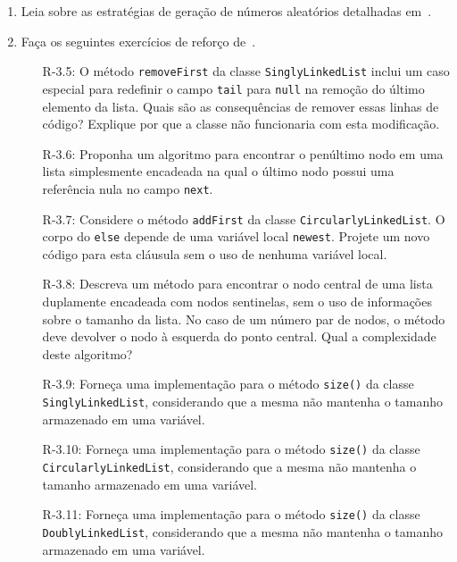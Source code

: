 \begin{enumerate}
	\item Leia sobre as estratégias de geração de números aleatórios detalhadas em~\cite{GoodrichAndTamassia2013}.
	
	\item Faça os seguintes exercícios de reforço de~\cite{GoodrichEtAl2014}.
	\begin{itemize}
		\item[R-3.5:] O método \texttt{removeFirst} da classe \texttt{SinglyLinkedList} inclui um caso especial para redefinir o campo \texttt{tail} para \texttt{null} na remoção do último elemento da lista. Quais são as consequências de remover essas linhas de código? Explique por que a classe não funcionaria com esta modificação.
		
		\item[R-3.6:] Proponha um algoritmo para encontrar o penúltimo nodo em uma lista simplesmente encadeada na qual o último nodo possui uma referência nula no campo \texttt{next}.
		
		\item[R-3.7:] Considere o método \texttt{addFirst} da classe \texttt{CircularlyLinkedList}. O corpo do \texttt{else} depende de uma variável local \texttt{newest}. Projete um novo código para esta cláusula sem o uso de nenhuma variável local.
		
		\item[R-3.8:] Descreva um método para encontrar o nodo central de uma lista duplamente encadeada com nodos sentinelas, sem o uso de informações sobre o tamanho da lista. No caso de um número par de nodos, o método deve devolver o nodo à esquerda do ponto central. Qual a complexidade deste algoritmo?
		
		\item[R-3.9:] Forneça uma implementação para o método \texttt{size()} da classe \texttt{SinglyLinkedList}, considerando que a mesma não mantenha o tamanho armazenado em uma variável.
		
		\item[R-3.10:] Forneça uma implementação para o método \texttt{size()} da classe \texttt{CircularlyLinkedList}, considerando que a mesma não mantenha o tamanho armazenado em uma variável.
		
		\item[R-3.11:] Forneça uma implementação para o método \texttt{size()} da classe \texttt{DoublyLinkedList}, considerando que a mesma não mantenha o tamanho armazenado em uma variável.
		

\end{itemize}
\end{enumerate}

